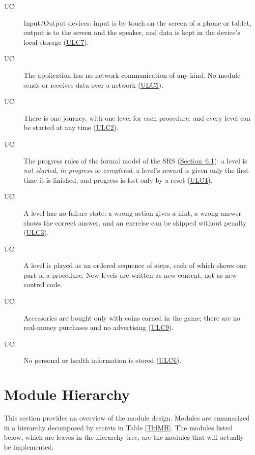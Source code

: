 \documentclass[12pt, titlepage]{article}
\newcounter{ucnum}
\newcommand{\uctheucnum}{UC\theucnum}
\newcommand{\srsurl}{https://team-hindsight.github.io/ophthamology-game/SRS/SRS.pdf}
\newcommand{\srsitemref}[2]{\href{\srsurl\#nameddest=#1}{#2}}
\begin{document}
\begin{description}
\item[ \uctheucnum \label{ucIO}:] Input/Output devices:
  input is by touch on the screen of a phone or tablet, output is to the
  screen and the speaker, and data is kept in the device's local storage
  (\srsitemref{ULC_Mobile}{ULC7}).
\item[ \uctheucnum \label{ucOffline}:] The application
  has no network communication of any kind. No module sends or receives data
  over a network (\srsitemref{ULC_Offline}{ULC5}).
\item[ \uctheucnum \label{ucJourney}:] There is one
  journey, with one level for each procedure, and every level can be started at
  any time (\srsitemref{ULC_Journey}{ULC2}).
\item[ \uctheucnum \label{ucRules}:] The progress rules
  of the formal model of the SRS (\srsitemref{sec_FormalSpec}{Section~6.1}): a level is \emph{not
  started}, \emph{in progress} or \emph{completed}, a level's reward is given
  only the first time it is finished, and progress is lost only by a reset
  (\srsitemref{ULC_RewardOnce}{ULC4}).
\item[ \uctheucnum \label{ucNoFail}:] A level has no
  failure state: a wrong action gives a hint, a wrong answer shows the correct
  answer, and an exercise can be skipped without penalty
  (\srsitemref{ULC_NoFail}{ULC3}).
\item[ \uctheucnum \label{ucSteps}:] A level is played as
  an ordered sequence of steps, each of which shows one part of a procedure.
  New levels are written as new content, not as new control code.
\item[ \uctheucnum \label{ucMoney}:] Accessories are
  bought only with coins earned in the game; there are no real-money purchases
  and no advertising (\srsitemref{ULC_NoRealMoney}{ULC9}).
\item[ \uctheucnum \label{ucPersonal}:] No personal or
  health information is stored (\srsitemref{ULC_NoPersonalInfo}{ULC6}).
\end{description}

\section{Module Hierarchy} \label{SecMH}

This section provides an overview of the module design. Modules are summarized
in a hierarchy decomposed by secrets in Table \ref{TblMH}. The modules listed
below, which are leaves in the hierarchy tree, are the modules that will
actually be implemented.
\end{document}
